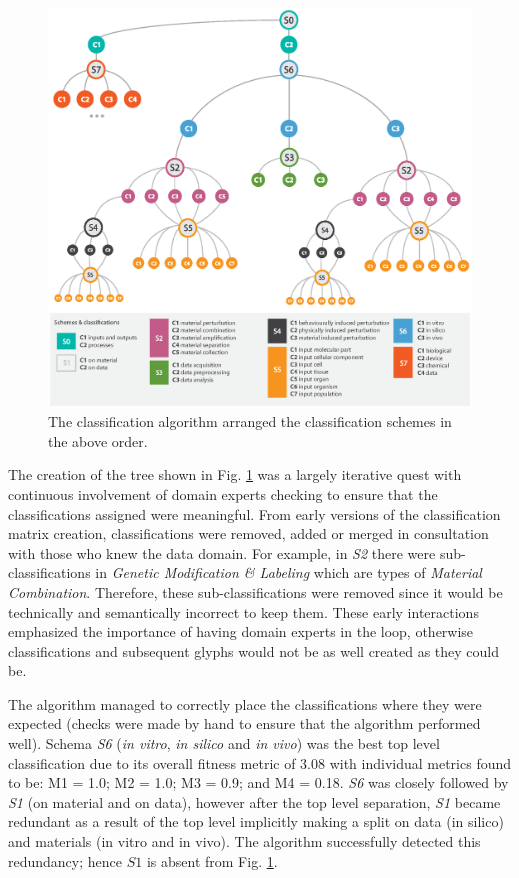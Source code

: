 \begin{figure}[ht!]
\centering
\includegraphics[scale=0.44]{images/glyph-taxonomy/fitness-classification.eps}
\caption{The classification algorithm arranged the classification schemes in the above order.}
\label{fig:fitness-classification}
\vspace{-10pt}
\end{figure}

The creation of the tree shown in Fig. \ref{fig:fitness-classification} was a largely iterative quest with continuous involvement of domain experts checking to ensure that the classifications assigned were meaningful. From early versions of the classification matrix creation, classifications were removed, added or merged in consultation with those who knew the data domain. For example, in \emph{S2} there were sub-classifications in \emph{Genetic Modification \& Labeling} which are types of \emph{Material Combination}. Therefore, these sub-classifications were removed since it would be technically and semantically incorrect to keep them. These early interactions emphasized the importance of having domain experts in the loop, otherwise classifications and subsequent glyphs would not be as well created as they could be.

The algorithm managed to correctly place the classifications where they were expected (checks were made by hand to ensure that the algorithm performed well). Schema \emph{S6} (\emph{in vitro}, \emph{in silico} and \emph{in vivo}) was the best top level classification due to its overall fitness metric of 3.08 with individual metrics found to be: M1 = 1.0; M2 = 1.0; M3 = 0.9; and M4 = 0.18. \emph{S6} was closely followed by \emph{S1} (on material and on data), however after the top level separation, \emph{S1} became redundant as a result of the top level implicitly making a split on data (in silico) and materials (in vitro and in vivo). The algorithm successfully detected this redundancy; hence $S1$ is absent from Fig. \ref{fig:fitness-classification}. 

